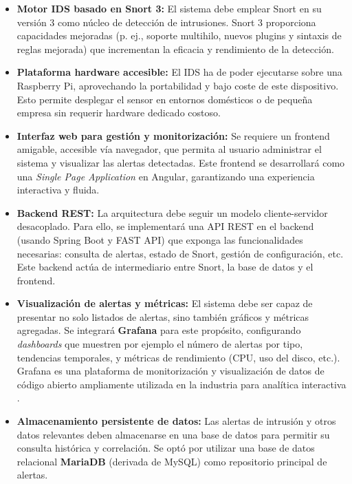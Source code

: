 \documentclass[11pt,a4paper,twoside]{report}
\begin{document}
\begin{itemize}
	\item \textbf{Motor IDS basado en Snort 3:} El sistema debe emplear Snort en su versión 3 como núcleo de detección de intrusiones. Snort 3 proporciona capacidades mejoradas (p. ej., soporte multihilo, nuevos plugins y sintaxis de reglas mejorada) que incrementan la eficacia y rendimiento de la detección.
	
	\item \textbf{Plataforma hardware accesible:} El IDS ha de poder ejecutarse sobre una Raspberry Pi, aprovechando la portabilidad y bajo coste de este dispositivo. Esto permite desplegar el sensor en entornos domésticos o de pequeña empresa sin requerir hardware dedicado costoso.
	
	\item \textbf{Interfaz web para gestión y monitorización:} Se requiere un frontend amigable, accesible vía navegador, que permita al usuario administrar el sistema y visualizar las alertas detectadas. Este frontend se desarrollará como una \emph{Single Page Application} en Angular, garantizando una experiencia interactiva y fluida.
	
	\item \textbf{Backend REST:} La arquitectura debe seguir un modelo cliente-servidor desacoplado. Para ello, se implementará una API REST en el backend (usando Spring Boot y FAST API) que exponga las funcionalidades necesarias: consulta de alertas, estado de Snort, gestión de configuración, etc. Este backend actúa de intermediario entre Snort, la base de datos y el frontend.
	
	\item \textbf{Visualización de alertas y métricas:} El sistema debe ser capaz de presentar no solo listados de alertas, sino también gráficos y métricas agregadas. Se integrará \textbf{Grafana} para este propósito, configurando \emph{dashboards} que muestren por ejemplo el número de alertas por tipo, tendencias temporales, y métricas de rendimiento (CPU, uso del disco, etc.). Grafana es una plataforma de monitorización y visualización de datos de código abierto ampliamente utilizada en la industria para analítica interactiva \cite{Grafana}.
	
	\item \textbf{Almacenamiento persistente de datos:} Las alertas de intrusión y otros datos relevantes deben almacenarse en una base de datos para permitir su consulta histórica y correlación. Se optó por utilizar una base de datos relacional \textbf{MariaDB} (derivada de MySQL) como repositorio principal de alertas.
	

\end{itemize}
\end{document}
